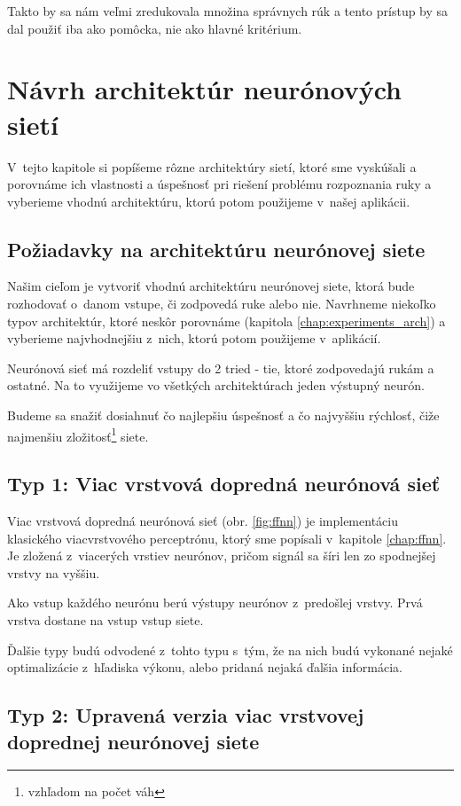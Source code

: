 Takto by sa nám veľmi zredukovala množina správnych rúk a tento prístup by sa dal použiť iba ako pomôcka, nie ako hlavné kritérium.

\section{Návrh architektúr neurónových sietí}\label{chap:neuralnetarch}

V~tejto kapitole si popíšeme rôzne architektúry sietí, ktoré sme vyskúšali a porovnáme ich vlastnosti a úspešnosť pri riešení problému rozpoznania ruky a vyberieme vhodnú architektúru, ktorú potom použijeme v~našej aplikácii.

\subsection{Požiadavky na architektúru neurónovej siete}

Našim cieľom je vytvoriť vhodnú architektúru neurónovej siete, ktorá bude rozhodovať o~danom vstupe, či zodpovedá ruke alebo nie. 
Navrhneme niekoľko typov architektúr, ktoré neskôr porovnáme (kapitola \ref{chap:experiments_arch}) a vyberieme najvhodnejšiu z~nich, ktorú potom použijeme v~aplikácií. 

Neurónová sieť má rozdeliť vstupy do 2 tried - tie, ktoré zodpovedajú rukám a ostatné. Na to využijeme vo všetkých architektúrach jeden výstupný neurón.

Budeme sa snažiť dosiahnuť čo najlepšiu úspešnosť a čo najvyššiu rýchlosť, čiže najmenšiu zložitosť\footnote{vzhľadom na počet váh} siete.

\subsection{Typ 1: Viac vrstvová dopredná neurónová sieť}

Viac vrstvová dopredná neurónová sieť (obr. \ref{fig:ffnn}) je implementáciu klasického viacvrstvového perceptrónu, ktorý sme popísali v~kapitole \ref{chap:ffnn}. Je zložená z~viacerých vrstiev neurónov, pričom signál sa šíri len zo spodnejšej vrstvy na vyššiu.

Ako vstup každého neurónu berú výstupy neurónov z~predošlej vrstvy. Prvá vrstva dostane na vstup vstup siete. 

Ďalšie typy budú odvodené z~tohto typu s~tým, že na nich budú vykonané nejaké optimalizácie z~hľadiska výkonu, alebo pridaná nejaká ďalšia informácia.

\subsection{Typ 2: Upravená verzia viac vrstvovej doprednej neurónovej siete}

